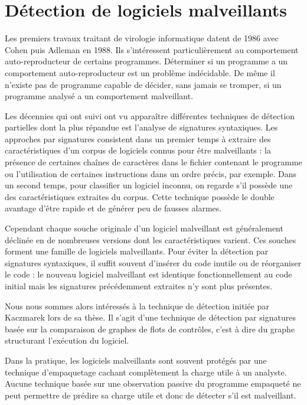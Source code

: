 \section*{Détection de logiciels malveillants}
Les premiers travaux traitant de virologie informatique datent de 1986 avec Cohen \cite{Cohen86} puis Adleman \cite{Adleman88} en 1988. Ils s'intéressent particulièrement au comportement auto-reproducteur de certains programmes. Déterminer si un programme a un comportement auto-reproducteur est un problème indécidable. De même il n'existe pas de programme capable de décider, sans jamais se tromper, si un programme analysé a un comportement malveillant.

Les décennies qui ont suivi ont vu apparaître différentes techniques de détection partielles dont la plus répandue est l'analyse de signatures syntaxiques. Les approches par signatures consistent dans un premier temps à extraire des caractéristiques d'un corpus de logiciels connus pour être malveillants : la présence de certaines chaînes de caractères dans le fichier contenant le programme ou l'utilisation de certaines instructions dans un ordre précis, par exemple. Dans un second temps, pour classifier un logiciel inconnu, on regarde s'il possède une des caractéristiques extraites du corpus.
Cette technique possède le double avantage d'être rapide et de générer peu de fausses alarmes.

Cependant chaque souche originale d'un logiciel malveillant est généralement déclinée en de nombreuses versions dont les caractéristiques varient. Ces souches forment une famille de logiciels malveillants. Pour éviter la détection par signatures syntaxiques, il suffit souvent d'insérer du code inutile ou de réorganiser le code : le nouveau logiciel malveillant est identique fonctionnellement au code initial mais les signatures précédemment extraites n'y sont plus présentes.

Nous nous sommes alors intéressés à la technique de détection initiée par Kaczmarek \cite{BKM08} lors de sa thèse. Il s'agit d'une technique de détection par signatures basée sur la comparaison de graphes de flots de contrôles, c'est à dire du graphe structurant l'exécution du logiciel.

Dans la pratique, les logiciels malveillants sont souvent protégés par une technique d'empaquetage cachant complètement la charge utile à un analyste.
Aucune technique basée sur une observation passive du programme empaqueté ne peut permettre de prédire sa charge utile et donc de détecter s'il est malveillant.

